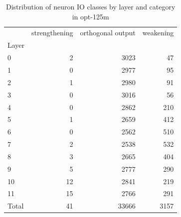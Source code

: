 \begin{table}
\caption{Distribution of neuron IO classes by layer and category in opt-125m}
\label{tab:opt-125m}
\begin{tabular}{lrrr}
 & strengthening & orthogonal output & weakening \\
Layer &  &  &  \\
0 & 2 & 3023 & 47 \\
1 & 0 & 2977 & 95 \\
2 & 1 & 2980 & 91 \\
3 & 0 & 3016 & 56 \\
4 & 0 & 2862 & 210 \\
5 & 1 & 2659 & 412 \\
6 & 0 & 2562 & 510 \\
7 & 2 & 2538 & 532 \\
8 & 3 & 2665 & 404 \\
9 & 5 & 2777 & 290 \\
10 & 12 & 2841 & 219 \\
11 & 15 & 2766 & 291 \\
Total & 41 & 33666 & 3157 \\
\end{tabular}
\end{table}

